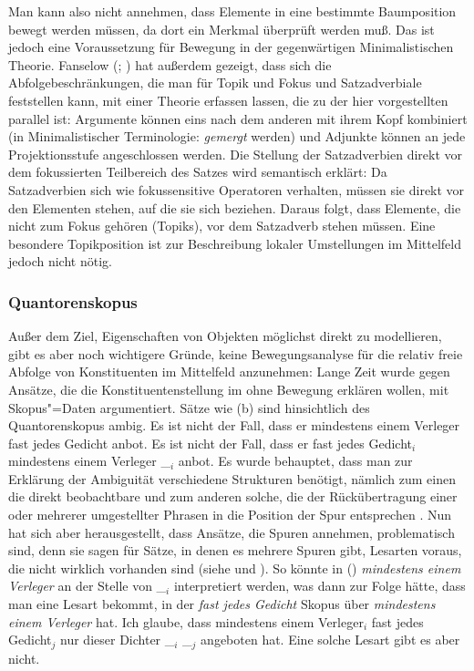 Man kann also nicht annehmen, dass Elemente in eine bestimmte Baumposition bewegt werden müssen,
da dort ein Merkmal überprüft werden muß. Das ist jedoch eine Voraussetzung für Bewegung in
der gegenwärtigen Minimalistischen Theorie. Fanselow (\citeyear[Abschnitt~4]{Fanselow2003b}; \citeyear[]{Fanselow2006a}) 
hat außerdem gezeigt, dass sich die Abfolgebeschränkungen,
die man für Topik und Fokus und Satzadverbiale
feststellen kann, mit einer Theorie erfassen lassen,
die zu der hier vorgestellten parallel ist: Argumente können eins nach dem anderen mit ihrem Kopf
kombiniert (in Minimalistischer Terminologie: \emph{gemergt} werden) und Adjunkte können an jede
Projektionsstufe angeschlossen werden. Die Stellung der Satzadverbien direkt vor dem fokussierten
Teilbereich des Satzes wird semantisch erklärt: Da Satzadverbien sich wie fokussensitive Operatoren
verhalten, müssen sie direkt vor den Elementen stehen, auf die sie sich beziehen. Daraus folgt,
dass Elemente, die nicht zum Fokus gehören (Topiks), vor dem Satzadverb stehen müssen. Eine besondere
Topikposition ist zur Beschreibung lokaler Umstellungen im Mittelfeld jedoch nicht nötig.
%

\subsubsection{Quantorenskopus}
\label{sec-Scrambling-Skopus}

Außer
dem Ziel, Eigenschaften von Objekten möglichst direkt zu modellieren, gibt es aber noch wichtigere
Gründe, keine Bewegungsanalyse für die relativ freie Abfolge von Konstituenten im Mittelfeld anzunehmen:
Lange Zeit wurde gegen Ansätze, die die Konstituentenstellung im \mf ohne Bewegung erklären wollen,
mit Skopus"=Daten argumentiert. Sätze wie (b) sind hinsichtlich des Quantorenskopus ambig.
\eal
\ex Es ist nicht der Fall, dass er mindestens einem Verleger fast jedes Gedicht anbot.
\ex Es ist nicht der Fall, dass er fast jedes Gedicht$_i$ mindestens einem Verleger \_$_i$ anbot.
\zl
Es wurde behauptet, dass man zur Erklärung der Ambiguität verschiedene Strukturen benötigt, nämlich
zum einen die direkt beobachtbare und zum anderen solche, die der Rückübertragung einer oder
mehrerer umgestellter Phrasen in die Position der Spur entsprechen \citep{Frey93a}.
Nun hat sich aber herausgestellt, dass Ansätze, die Spuren annehmen,
problematisch sind, denn sie sagen für Sätze, in denen es mehrere Spuren gibt, 
Lesarten voraus, die nicht wirklich vorhanden sind (siehe  und ).
So könnte \zb in () \emph{mindestens einem Verleger} an der Stelle von \_$_i$ interpretiert werden,
was dann zur Folge hätte, dass man eine Lesart bekommt, in der
\emph{fast jedes Gedicht} Skopus über \emph{mindestens einem Verleger} hat.
\ea
Ich glaube, dass mindestens einem Verleger$_i$ fast jedes Gedicht$_j$ nur dieser Dichter \_$_i$ \_$_j$ angeboten hat.
\z
Eine solche Lesart gibt es aber nicht.%

